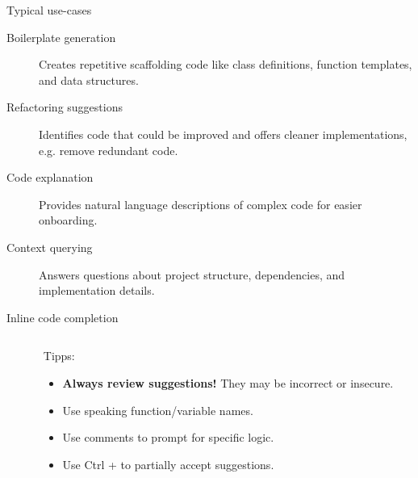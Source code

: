 \documentclass[
  aspectratio=1610,
]{beamer}
\begin{document}
\begin{frame}{Typical use-cases}
  \begin{description}
    \item[Boilerplate generation] Creates repetitive scaffolding code like class definitions, function templates, and data structures.
    \item[Refactoring suggestions] Identifies code that could be improved and offers cleaner implementations, e.g. remove redundant code.
    \item[Code explanation] Provides natural language descriptions of complex code for easier onboarding.
    \item[Context querying] Answers questions about project structure, dependencies, and implementation details.
  \end{description}
\end{frame}


\begin{frame}{Inline code completion}
  \begin{columns}[T,totalwidth=\textwidth]
    \begin{column}{0.6\textwidth}
    \end{column}
    \begin{column}{0.37\textwidth}
      Tipps:
      \begin{itemize}
        \item \textbf{Always review suggestions!} They may be incorrect or insecure.
        \item Use speaking function/variable names.
        \item Use comments to prompt for specific logic.
        \item Use Ctrl + \rightarrow to partially accept suggestions.
      \end{itemize}
    \end{column}
  \end{columns}
\end{frame}
\end{document}
